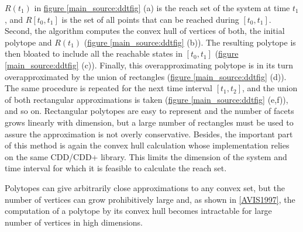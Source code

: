 \documentclass[letterpaper,10pt,english]{sphinxmanual}
\begin{document}
$R(t_1)$ in \hyperref[main_source:ddtfig]{figure  \ref*{main_source:ddtfig}} (a) is the reach set of the system at
time $t_1$, and $R[t_0, t_1]$ is the set of all points that
can be reached during $[t_0, t_1]$. Second, the algorithm computes
the convex hull of vertices of both, the initial polytope and
$R(t_1)$ (\hyperref[main_source:ddtfig]{figure  \ref*{main_source:ddtfig}} (b)). The resulting polytope is then
bloated to include all the reachable states in $[t_0,t_1]$ (\hyperref[main_source:ddtfig]{figure  \ref*{main_source:ddtfig}} (c)).
Finally, this overapproximating polytope is in its turn
overapproximated by the union of rectangles (\hyperref[main_source:ddtfig]{figure  \ref*{main_source:ddtfig}} (d)). The
same procedure is repeated for the next time interval $[t_1,t_2]$,
and the union of both rectangular approximations is taken (\hyperref[main_source:ddtfig]{figure  \ref*{main_source:ddtfig}} (e,f)),
and so on. Rectangular polytopes are easy to represent
and the number of facets grows linearly with dimension, but a large
number of rectangles must be used to assure the approximation is not
overly conservative. Besides, the important part of this method is again
the convex hull calculation whose implementation relies on the same
CDD/CDD+ library. This limits the dimension of the system and time
interval for which it is feasible to calculate the reach set.

Polytopes can give arbitrarily close approximations to any convex set,
but the number of vertices can grow prohibitively large and, as shown in
{\hyperref[main_source:avis1997]{{[}AVIS1997{]}}}, the computation of a polytope by its
convex hull becomes intractable for large number of vertices in high
dimensions.
\end{document}
